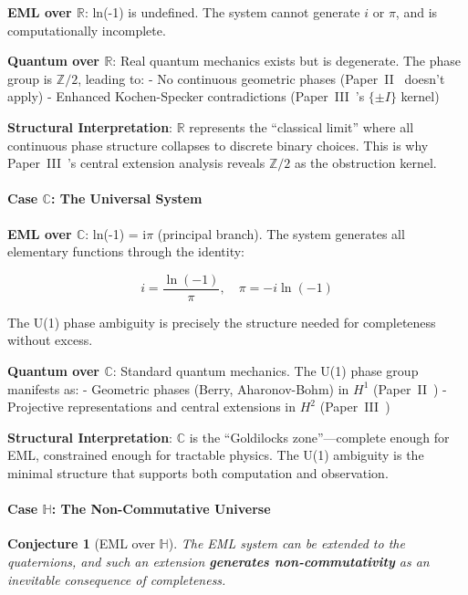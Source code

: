 \documentclass[11pt]{article}
\newtheorem{conjecture}[theorem]{Conjecture}
\begin{document}
\textbf{EML over $\mathbb{R}$}: ln(-1) is undefined. The system cannot generate \(i\) or \(\pi\), and is computationally incomplete.

\textbf{Quantum over $\mathbb{R}$}: Real quantum mechanics exists but is degenerate. The phase group is \(\mathbb{Z}/2\), leading to: - No continuous geometric phases (Paper~II~\cite{PaperII} doesn't apply) - Enhanced Kochen-Specker contradictions (Paper~III~\cite{PaperIII}'s \(\{\pm I\}\) kernel)

\textbf{Structural Interpretation}: $\mathbb{R}$ represents the ``classical limit'' where all continuous phase structure collapses to discrete binary choices. This is why Paper~III~\cite{PaperIII}'s central extension analysis reveals \(\mathbb{Z}/2\) as the obstruction kernel.

\paragraph{Case $\mathbb{C}$: The Universal System}
\label{case-ux2102-the-universal-system}

\textbf{EML over $\mathbb{C}$}: ln(-1) = i$\pi$ (principal branch). The system generates all elementary functions through the identity:

\[i = \frac{\ln(-1)}{\pi}, \quad \pi = -i\ln(-1)\]

The U(1) phase ambiguity is precisely the structure needed for completeness without excess.

\textbf{Quantum over $\mathbb{C}$}: Standard quantum mechanics. The U(1) phase group manifests as: - Geometric phases (Berry, Aharonov-Bohm) in \(H^1\) (Paper~II~\cite{PaperII}) - Projective representations and central extensions in \(H^2\) (Paper~III~\cite{PaperIII})

\textbf{Structural Interpretation}: $\mathbb{C}$ is the ``Goldilocks zone''---complete enough for EML, constrained enough for tractable physics. The U(1) ambiguity is the minimal structure that supports both computation and observation.

\paragraph{Case $\mathbb{H}$: The Non-Commutative Universe}
\label{case-ux210d-the-non-commutative-universe}

\begin{conjecture}[EML over $\mathbb{H}$]\label{conjecture:eml-h}
The EML system can be extended to the quaternions, and such an extension \textbf{generates non-commutativity} as an inevitable consequence of completeness.
\end{conjecture}
\end{document}
